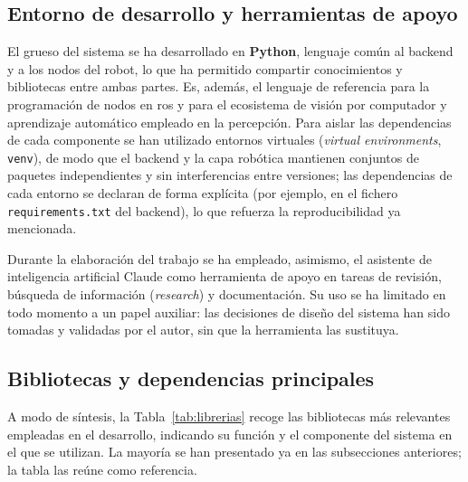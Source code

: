 \subsection{Entorno de desarrollo y herramientas de apoyo}

El grueso del sistema se ha desarrollado en \textbf{Python}, lenguaje común al
backend y a los nodos del robot, lo que ha permitido compartir conocimientos y
bibliotecas entre ambas partes. Es, además, el lenguaje de referencia para la
programación de nodos en \gls{ros} y para el ecosistema de visión por computador y
aprendizaje automático empleado en la percepción. Para aislar las dependencias de
cada componente se han utilizado entornos virtuales (\textit{virtual environments},
\texttt{venv}), de modo que el backend y la capa robótica mantienen conjuntos de
paquetes independientes y sin interferencias entre versiones; las dependencias de
cada entorno se declaran de forma explícita (por ejemplo, en el fichero
\texttt{requirements.txt} del backend), lo que refuerza la reproducibilidad ya
mencionada.

Durante la elaboración del trabajo se ha empleado, asimismo, el asistente de
inteligencia artificial Claude como herramienta de apoyo en tareas de revisión,
búsqueda de información (\textit{research}) y documentación. Su uso se ha limitado
en todo momento a un papel auxiliar: las decisiones de diseño del
sistema han sido tomadas y validadas por el autor, sin que la herramienta las
sustituya.

\subsection{Bibliotecas y dependencias principales}

A modo de síntesis, la Tabla~\ref{tab:librerias} recoge las bibliotecas más
relevantes empleadas en el desarrollo, indicando su función y el componente del
sistema en el que se utilizan. La mayoría se han presentado ya en las subsecciones
anteriores; la tabla las reúne como referencia.

